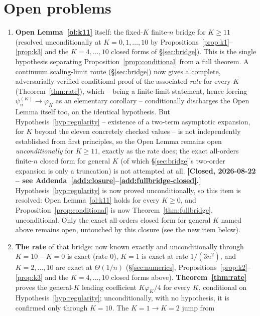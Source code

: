 \documentclass[11pt]{article}
\theoremstyle{remark}
\begin{document}
\section{Open problems}
\label{sec:open}

\begin{enumerate}
\item \textbf{Open Lemma~\ref{ol:k11}} itself: the fixed-$K$ finite-$n$
  bridge for $K\ge11$ (resolved unconditionally at $K=0,1,\dots,10$ by
  Propositions~\ref{prop:k1}--\ref{prop:k3} and the $K=4,\dots,10$
  closed forms of \S\ref{sec:bridge}). This is the single hypothesis
  separating Proposition~\ref{prop:conditional} from a full theorem. A
  continuum scaling-limit route (\S\ref{sec:bridge}) now gives a
  complete, adversarially-verified conditional proof of the associated
  \emph{rate} for every $K$ (Theorem~\ref{thm:rate}), which -- being a
  finite-limit statement, hence forcing $\psi_n^{(K)}\to\varphi_K$ as an
  elementary corollary -- conditionally discharges the Open Lemma itself
  too, on the identical hypothesis. But Hypothesis~\ref{hyp:regularity}
  -- existence of a two-term asymptotic expansion, for $K$ beyond the
  eleven concretely checked values -- is not independently established
  from first principles, so the Open Lemma remains open
  \emph{unconditionally} for $K\ge11$, exactly as the rate does; the
  exact all-orders finite-$n$ closed form for general $K$ (of which
  \S\ref{sec:bridge}'s two-order expansion is only a truncation) is not
  attempted at all. \textbf{[Closed, 2026-08-22 -- see
  Addenda~\ref{add:closure}--\ref{add:fullbridge-closed}.]}
  Hypothesis~\ref{hyp:regularity} is now proved unconditionally, so this
  item is resolved: Open Lemma~\ref{ol:k11} holds for every $K\ge0$, and
  Proposition~\ref{prop:conditional} is now Theorem~\ref{thm:fullbridge},
  unconditional. Only the exact all-orders closed form for general $K$
  named above remains open, untouched by this closure (see the new item
  below).
\item \textbf{The rate} of that bridge: now known exactly and
  unconditionally through $K=10$ -- $K=0$ is exact (rate $0$), $K=1$ is
  exact at rate $1/(3n^2)$, and $K=2,\dots,10$ are exact at $\Theta(1/n)$
  (\S\ref{sec:numerics}, Propositions~\ref{prop:k2}--\ref{prop:k3} and
  the $K=4,\dots,10$ closed forms above).
  \textbf{Theorem~\ref{thm:rate}} proves the general-$K$ leading
  coefficient $K\varphi_K/4$ for every $K$, conditional on
  Hypothesis~\ref{hyp:regularity}; unconditionally, with no hypothesis,
  it is confirmed only through $K=10$. The $K=1\to K=2$ jump from

\end{enumerate}
\end{document}
